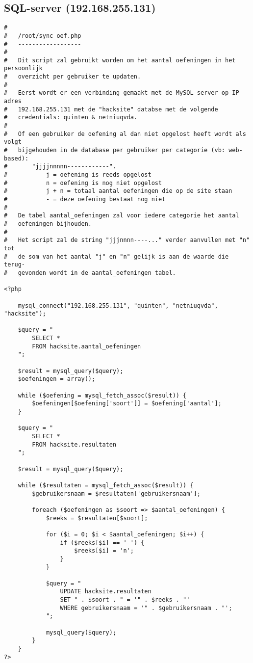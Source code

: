 \subsection{SQL-server (192.168.255.131)}
\begin{lstlisting}
#
#	/root/sync_oef.php
#	------------------
#
#	Dit script zal gebruikt worden om het aantal oefeningen in het  persoonlijk 
#	overzicht per gebruiker te updaten.
#
#	Eerst wordt er een verbinding gemaakt met de MySQL-server op IP-adres
#	192.168.255.131 met de "hacksite" databse met de volgende 
#	credentials: quinten & netniuqvda.
#
#	Of een gebruiker de oefening al dan niet opgelost heeft wordt als volgt
#	bijgehouden in de database per gebruiker per categorie (vb: web-based): 
#		"jjjjnnnnn------------".
#			j = oefening is reeds opgelost
#			n = oefening is nog niet opgelost
#			j + n = totaal aantal oefeningen die op de site staan
#			- = deze oefening bestaat nog niet
#
#	De tabel aantal_oefeningen zal voor iedere categorie het aantal
#	oefeningen bijhouden.
#
#	Het script zal de string "jjjnnnn----..." verder aanvullen met "n" tot
#	de som van het aantal "j" en "n" gelijk is aan de waarde die terug-
#	gevonden wordt in de aantal_oefeningen tabel.
    
<?php
    
   	mysql_connect("192.168.255.131", "quinten", "netniuqvda", "hacksite");
    
   	$query = "
   		SELECT *
   		FROM hacksite.aantal_oefeningen
   	";
          
    $result = mysql_query($query);
   	$oefeningen = array();
    
   	while ($oefening = mysql_fetch_assoc($result)) {
   		$oefeningen[$oefening['soort']] = $oefening['aantal'];
   	}
    
    $query = "
    	SELECT *
    	FROM hacksite.resultaten
    ";
         
    $result = mysql_query($query);
         
    while ($resultaten = mysql_fetch_assoc($result)) {
    	$gebruikersnaam = $resultaten['gebruikersnaam'];
    
    	foreach ($oefeningen as $soort => $aantal_oefeningen) {
    		$reeks = $resultaten[$soort];
    
    		for ($i = 0; $i < $aantal_oefeningen; $i++) {
    			if ($reeks[$i] == '-') {
    				$reeks[$i] = 'n';
    			}
    		}
    
    		$query = "
    			UPDATE hacksite.resultaten
    			SET " . $soort . " = '" . $reeks . "'
    			WHERE gebruikersnaam = '" . $gebruikersnaam . "';     
    	    ";
         
    		mysql_query($query);
    	}
	}
?>
\end{lstlisting}